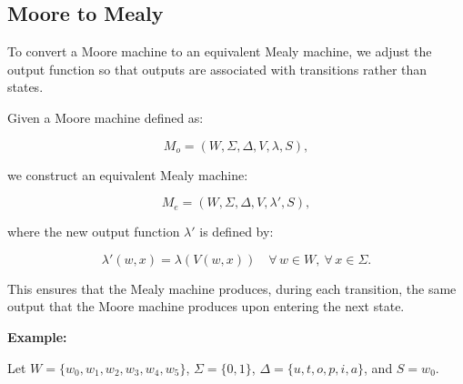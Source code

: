 \documentclass[12pt,a4paper,openany]{article}
\begin{document}
\subsection{Moore to Mealy}

To convert a Moore machine to an equivalent Mealy machine, we adjust the
output function so that outputs are associated with transitions rather
than states.

Given a Moore machine defined as:

\[
M_{o} = (W, \Sigma, \Delta, V, \lambda, S),
\]

we construct an equivalent Mealy machine:

\[
M_{e} = (W, \Sigma, \Delta, V, \lambda', S),
\]

where the new output function $\lambda'$ is defined by:

\[
\lambda'(w, x) = \lambda(V(w, x))
\quad\forall\, w \in W,\ \forall\, x \in \Sigma.
\]

This ensures that the Mealy machine produces, during each transition,
the same output that the Moore machine produces upon entering the next state.


\textbf{Example:}

Let $W = \{w_0, w_1, w_2, w_3, w_4, w_5\}$, $\Sigma = \{0, 1\}$, $\Delta = \{u, t, o, p, i, a\}$, and $S = w_0$.
\end{document}
